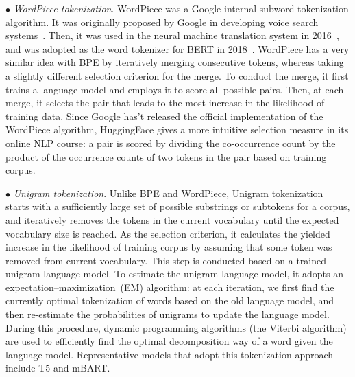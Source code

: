 $\bullet$ \emph{WordPiece tokenization}.  WordPiece was a Google internal subword tokenization algorithm. 
It was originally proposed by Google in developing voice search systems~\cite{Mike-ICASSP-2012-Japanese}. Then, it was  used in the neural machine translation system in 2016~\cite{Wu-CoRR-2016}, and  was adopted as the word tokenizer for BERT in 2018~\cite{Devlin-NAACL-2019-BERT}.  WordPiece has a very similar idea with BPE by iteratively merging consecutive tokens, whereas taking a slightly different  selection criterion for the merge. To conduct the merge, it first trains a language model and  employs it to score all possible pairs. Then, at each merge, it selects the pair that leads to the most increase in the likelihood of training data. 
Since Google has't released the official implementation of the WordPiece algorithm, HuggingFace gives a more intuitive selection measure  in its online NLP course: a pair is scored by dividing the co-occurrence count by the product of the occurrence counts of two tokens in the pair based on training corpus. 

$\bullet$ \emph{Unigram tokenization}.
Unlike BPE and WordPiece, Unigram tokenization~\cite{Kudo-ACL-2018-Subword} starts with a sufficiently large set of  possible substrings or subtokens for a corpus, and iteratively removes the tokens in the current vocabulary until the expected vocabulary size is reached. 
As the selection criterion, it calculates  the yielded increase in the likelihood of training corpus by assuming that some token was removed from current vocabulary.  
This step is conducted based on a trained unigram language model. To estimate the unigram language model, it adopts 
an expectation–maximization~(EM) algorithm: at each iteration, we first find the currently optimal tokenization of words based on the old language model, and then re-estimate the probabilities of unigrams to update the language model. During this procedure, dynamic programming algorithms (\ie the Viterbi algorithm) are  used to efficiently find the optimal decomposition way of a word given the language model. 
Representative models that adopt this tokenization approach include T5 and mBART. 

%



